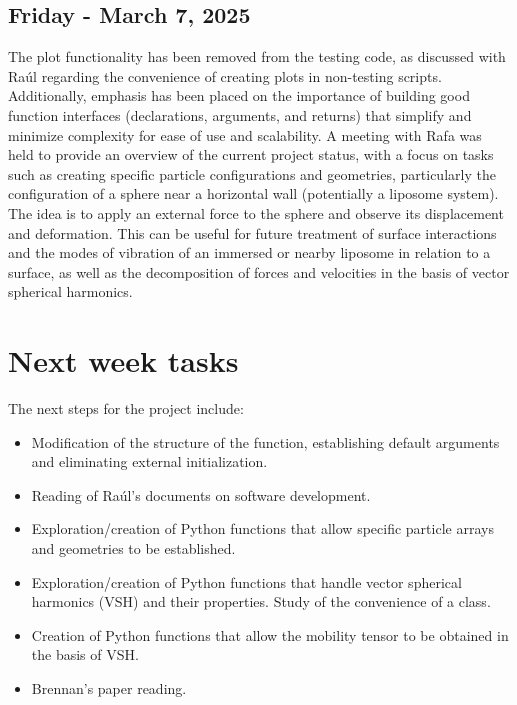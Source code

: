\documentclass[12pt]{article} %
\begin{document}
\subsection{Friday - March 7, 2025}
The plot functionality has been removed from the testing code,
as discussed with Raúl regarding the convenience of creating plots
in non-testing scripts. Additionally, emphasis has been placed on
the importance of building good function interfaces (declarations,
arguments, and returns) that simplify and minimize complexity for
ease of use and scalability. A meeting with Rafa was held to provide
an overview of the current project status, with a focus on tasks such
as creating specific particle configurations and geometries,
particularly the configuration of a sphere near a horizontal wall
(potentially a liposome system). The idea is to apply an external
force to the sphere and observe its displacement and deformation.
This can be useful for future treatment of surface interactions
and the modes of vibration of an immersed or nearby liposome in
relation to a surface, as well as the decomposition of forces and
velocities in the basis of vector spherical harmonics.

\section{Next week tasks}
The next steps for the project include:
\begin{itemize} 
    \item Modification of the structure of the  function, establishing default arguments and eliminating external initialization.
    \item Reading of Raúl's documents on software development.
    \item Exploration/creation of Python functions that allow specific particle arrays and geometries to be established.
    \item Exploration/creation of Python functions that handle vector spherical harmonics (VSH) and their properties. Study of the convenience of a class.
    \item Creation of Python functions that allow the mobility tensor to be obtained in the basis of VSH.
    \item Brennan's paper reading.
\end{itemize}
\end{document}
